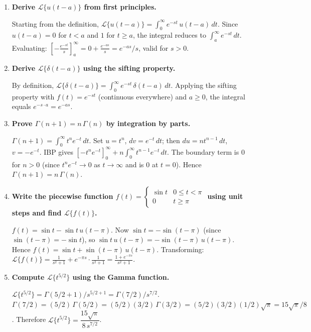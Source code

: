\documentclass[12pt,a4paper]{article}
\begin{document}
\begin{enumerate}

\item \textbf{Derive $\mathcal{L}\{u(t-a)\}$ from first principles.}

Starting from the definition,
$\mathcal{L}\{u(t-a)\} = \int_0^{\infty} e^{-st}\,u(t-a)\,dt$.
Since $u(t-a) = 0$ for $t < a$ and $1$ for $t \geq a$, the integral reduces to
$\int_a^{\infty} e^{-st}\,dt$.  Evaluating:
$\left[-\tfrac{e^{-st}}{s}\right]_a^{\infty} = 0 + \tfrac{e^{-as}}{s} = e^{-as}/s$,
valid for $s > 0$.

\item \textbf{Derive $\mathcal{L}\{\delta(t-a)\}$ using the sifting property.}

By definition,
$\mathcal{L}\{\delta(t-a)\} = \int_0^{\infty} e^{-st}\,\delta(t-a)\,dt$.
Applying the sifting property with $f(t) = e^{-st}$ (continuous everywhere) and
$a \geq 0$, the integral equals $e^{-s\cdot a} = e^{-as}$.

\item \textbf{Prove $\Gamma(n+1) = n\,\Gamma(n)$ by integration by parts.}

$\Gamma(n+1) = \int_0^{\infty} t^n e^{-t}\,dt$.
Set $u = t^n$, $dv = e^{-t}\,dt$; then $du = nt^{n-1}\,dt$, $v = -e^{-t}$.
IBP gives $[-t^n e^{-t}]_0^{\infty} + n\int_0^{\infty} t^{n-1}e^{-t}\,dt$.
The boundary term is 0 for $n > 0$ (since $t^n e^{-t} \to 0$ as $t\to\infty$
and is 0 at $t=0$).  Hence $\Gamma(n+1) = n\,\Gamma(n)$.

\item \textbf{Write the piecewise function
$f(t) = \begin{cases} \sin t & 0 \leq t < \pi \\ 0 & t \geq \pi \end{cases}$
using unit steps and find $\mathcal{L}\{f(t)\}$.}

$f(t) = \sin t - \sin t\,u(t-\pi)$.
Now $\sin t = -\sin(t - \pi)$ (since $\sin(t-\pi) = -\sin t$), so
$\sin t\,u(t-\pi) = -\sin(t-\pi)\,u(t-\pi)$.
Hence $f(t) = \sin t + \sin(t-\pi)\,u(t-\pi)$.
Transforming: $\mathcal{L}\{f(t)\} = \tfrac{1}{s^2+1} + e^{-\pi s}\cdot\tfrac{1}{s^2+1}
= \tfrac{1+e^{-\pi s}}{s^2+1}$.

\item \textbf{Compute $\mathcal{L}\{t^{5/2}\}$ using the Gamma function.}

$\mathcal{L}\{t^{5/2}\} = \Gamma(5/2+1)/s^{5/2+1} = \Gamma(7/2)/s^{7/2}$.
$\Gamma(7/2) = (5/2)\,\Gamma(5/2) = (5/2)(3/2)\,\Gamma(3/2) = (5/2)(3/2)(1/2)\sqrt{\pi}
= 15\sqrt{\pi}/8$.
Therefore $\mathcal{L}\{t^{5/2}\} = \dfrac{15\sqrt{\pi}}{8\,s^{7/2}}$.

\end{enumerate}
\end{document}
